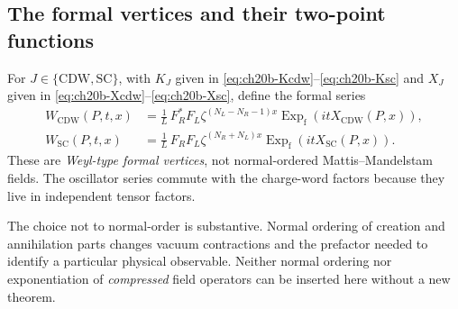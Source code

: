 \subsection{The formal vertices and their two-point functions}
\label{subsec:ch20b-correlators}

\begin{definition}
\label{def:ch20b-vertices}
For \(J\in\{\mathrm{CDW},\mathrm{SC}\}\), with \(K_J\) given in
\eqref{eq:ch20b-Kcdw}--\eqref{eq:ch20b-Ksc} and \(X_J\) given in
\eqref{eq:ch20b-Xcdw}--\eqref{eq:ch20b-Xsc}, define the formal series
\begin{align}
 W_{\mathrm{CDW}}(P,t,x)
 &=\frac1L\,F_R^*F_L\zeta^{(N_L-N_R-1)x}
    \operatorname{Exp}_{\mathrm f}(itX_{\mathrm{CDW}}(P,x)),
 \label{eq:ch20b-Wcdw}\\
 W_{\mathrm{SC}}(P,t,x)
 &=\frac1L\,F_RF_L\zeta^{(N_R+N_L)x}
    \operatorname{Exp}_{\mathrm f}(itX_{\mathrm{SC}}(P,x)).
 \label{eq:ch20b-Wsc}
\end{align}
These are \emph{Weyl-type formal vertices}, not normal-ordered
Mattis--Mandelstam fields.  The oscillator series commute with the
charge-word factors because they live in independent tensor factors.
\end{definition}

The choice not to normal-order is substantive.  Normal ordering of
creation and annihilation parts changes vacuum contractions and the
prefactor needed to identify a particular physical observable.  Neither
normal ordering nor exponentiation of \emph{compressed} field operators
can be inserted here without a new theorem.

